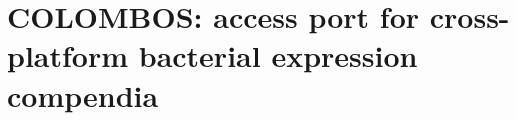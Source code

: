 \chapter{COLOMBOS: access port for cross-platform bacterial expression compendia}\label{ch:colombos}


\instructionsintroduction

%
%
%



